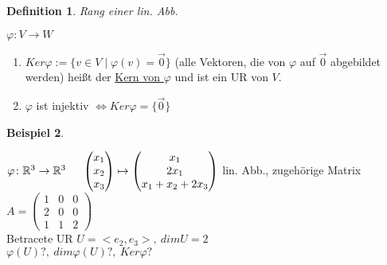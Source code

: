 \documentclass[a4paper,11pt]{article}
\newtheorem{definition}{Definition}[section]
\newtheorem{bsp}[definition]{Beispiel}
\newcommand{\zerovec}{\overset{\rightarrow}{0}}
\newcommand{\hsp}{\hspace{5mm}}
\begin{document}
\newpage

\begin{definition}
Rang einer lin. Abb.
\end{definition}
$\varphi\colon V\rightarrow W$
\begin{enumerate}[label=\alph*)]
	\item $Ker\varphi:=\{v\in V\mid\varphi(v)=\zerovec\}$ (alle Vektoren, die von $\varphi$ auf $\zerovec$ abgebildet werden) heißt der \underline{Kern von $\varphi$} und ist ein UR von $V$.
	\item $\varphi$ ist injektiv $\Leftrightarrow Ker\varphi=\{\zerovec\}$
\end{enumerate}

\begin{bsp}
\end{bsp}
$\varphi\colon\mathbb{R}^3\rightarrow\mathbb{R}^3\hsp\begin{pmatrix}x_1\\x_2\\x_3\end{pmatrix}\mapsto\begin{pmatrix}x_1\\2x_1\\x_1+x_2+2x_3\end{pmatrix}$ lin. Abb., zugehörige Matrix $A=\begin{pmatrix}1&0&0\\2&0&0\\1&1&2\end{pmatrix}$ \\
Betracete UR $U=<e_2,e_3>,\:dimU=2$ \\
$\varphi(U)?,\:dim\varphi(U)?,\:Ker\varphi?$
\end{document}
